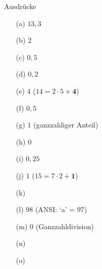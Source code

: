\begin{frame}[t]
\begin{exercise}{Ausdrücke}
\begin{solution}
\begin{center}
\begin{minipage}{0.3\textwidth}
\begin{itemize}
\item[(a)] $13{,}3$  \\ 
\item[(b)] $2$       \\ 
\item[(c)] $0{,}5$   \\ 
\item[(d)] $0{,}2$   \\ 
\item[(e)] $4$ ($14 = 2\cdot 5 + \boldsymbol{4}$) \\ 
\end{itemize}
\end{minipage}
\begin{minipage}{0.3\textwidth}
\begin{itemize}
\item[(f)] $0{,}5$   \\ 
\item[(g)] $1$ (ganzzahliger Anteil) \\ 
\item[(h)] $0$               \\ 
\item[(i)] $0{,}25$  \\ 
\item[(j)] $1$ ($15 = 7\cdot 2 + \boldsymbol{1}$) \\ 
\end{itemize}
\end{minipage}
\begin{minipage}{0.3\textwidth}
\begin{itemize}
\item[(k)]           \\ 
\item[(l)] $98$ (ANSI: `a' = $97$) \\ 
\item[(m)] $0$  (Ganzzahldivision) \\ 
\item[(n)]       \\ 
\item[(o)]             \\ 
\end{itemize}
\end{minipage}
\end{center}
\end{solution}

\end{exercise}
\end{frame}
